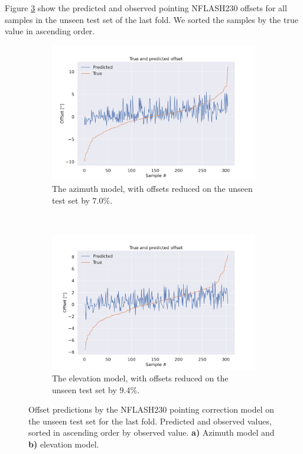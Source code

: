Figure \ref{fig:sortpred_selected_result_xgb} show the predicted and observed pointing NFLASH230 offsets for all samples in the unseen test set of the last fold.
We sorted the samples by the true value in ascending order.


\begin{figure}[H]
    \centering
    \begin{subfigure}[t]{\textwidth}
        \centering
        \includegraphics[width=\textwidth]{Results/sortpred_XGB_ds2_tp5_k30_uncorr_az_test.pdf}
        \caption{The azimuth model, with offsets reduced on the unseen test set by $7.0\%$.}
        \label{subfig:sortpred_lastfold_nflash230_az}
    \end{subfigure}
    \\
    \begin{subfigure}[t]{\textwidth}
       \centering
       \includegraphics[width=1\textwidth]{Results/sortpred_XGB_ds2_tp5_k40_uncorr_el_test.pdf}
       \caption{The elevation model, with offsets reduced on the unseen test set by $9.4\%$.}
       \label{subfig:sortpred_lastfold_nflash230_el}
    \end{subfigure}
    \caption[Sorted offset prediction and true values]{Offset predictions by the NFLASH230 pointing correction model on the unseen test set for the last fold.
     Predicted and observed values, sorted in ascending order by observed value. \textbf{a)} Azimuth model and \textbf{b)} elevation model.}
    \label{fig:sortpred_selected_result_xgb}
\end{figure}



